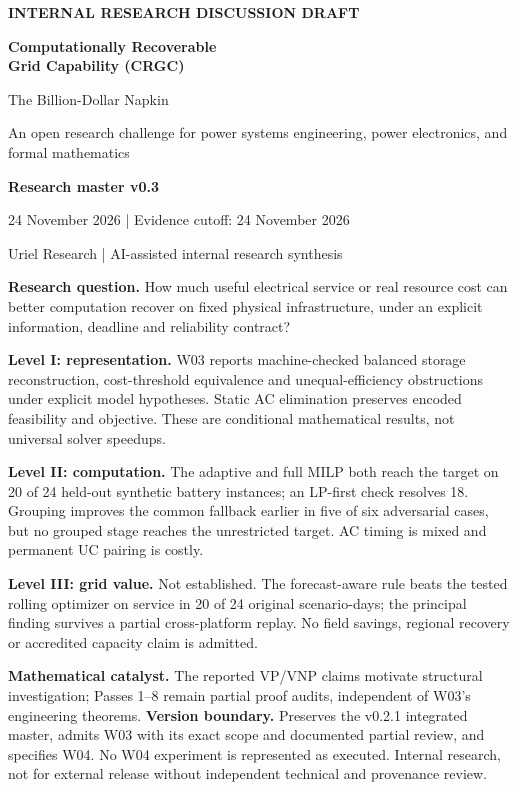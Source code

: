 \documentclass[11pt,letterpaper]{article}
\begin{document}
\hypersetup{pageanchor=false}\begin{titlepage}
{\small\bfseries INTERNAL RESEARCH DISCUSSION DRAFT\par}\vspace{1.2cm}
{\Huge\color{navy}\bfseries Computationally Recoverable\\[4pt] Grid Capability (CRGC)\par}\vspace{0.6cm}
{\LARGE The Billion-Dollar Napkin\par}\vspace{0.35cm}
{\large An open research challenge for power systems engineering, power electronics, and formal mathematics\par}\vspace{0.8cm}
{\Large\bfseries Research master v0.3\par}
24 November 2026 \quad | \quad Evidence cutoff: 24 November 2026\par
Uriel Research \quad | \quad AI-assisted internal research synthesis\par
\vspace{0.9cm}
\textbf{Research question.} How much useful electrical service or real resource cost can better computation recover on fixed physical infrastructure, under an explicit information, deadline and reliability contract?

\textbf{Level I: representation.} W03 reports machine-checked balanced storage reconstruction, cost-threshold equivalence and unequal-efficiency obstructions under explicit model hypotheses. Static AC elimination preserves encoded feasibility and objective. These are conditional mathematical results, not universal solver speedups.

\textbf{Level II: computation.} The adaptive and full MILP both reach the target on 20 of 24 held-out synthetic battery instances; an LP-first check resolves 18. Grouping improves the common fallback earlier in five of six adversarial cases, but no grouped stage reaches the unrestricted target. AC timing is mixed and permanent UC pairing is costly.

\textbf{Level III: grid value.} Not established. The forecast-aware rule beats the tested rolling optimizer on service in 20 of 24 original scenario-days; the principal finding survives a partial cross-platform replay. No field savings, regional recovery or accredited capacity claim is admitted.

\textbf{Mathematical catalyst.} The reported VP/VNP claims motivate structural investigation; Passes 1--8 remain partial proof audits, independent of W03's engineering theorems.
\vfill
\textbf{Version boundary.} Preserves the v0.2.1 integrated master, admits W03 with its exact scope and documented partial review, and specifies W04. No W04 experiment is represented as executed. Internal research, not for external release without independent technical and provenance review.
\end{titlepage}\hypersetup{pageanchor=true}
\end{document}
